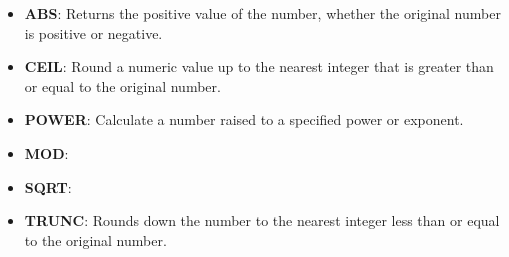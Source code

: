 \setlength{\columnsep}{3pt}
\begin{flushleft}
	
	\begin{itemize}
		\item \textbf{ABS}: Returns the positive value of the number, whether the original number is positive or negative.
		\bigskip
		\item \textbf{CEIL}: Round a numeric value up to the nearest integer that is greater than or equal to the original number.
		\bigskip
		\newpage
		\item \textbf{POWER}: Calculate a number raised to a specified power or exponent.
		\item \textbf{MOD}: 
		\item \textbf{SQRT}:
		
		\item \textbf{TRUNC}: Rounds down the number to the nearest integer less than or equal to the original number.
		
	\end{itemize}
	

\end{flushleft}
